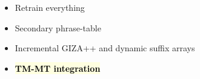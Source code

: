 \documentclass[landscape]{uedslides2C}
\newcommand{\currenttopic}[1]{\colorbox{lightyellow}{\textcolor{black}{\bf #1}}}
\begin{document}
% 
% 
% 
% 
% 
% 


\begin{itemize}
\item Retrain everything
\item Secondary phrase-table
\item Incremental GIZA++ and dynamic suffix arrays
\item \currenttopic{TM-MT integration}

\end{itemize}


\end{document}
